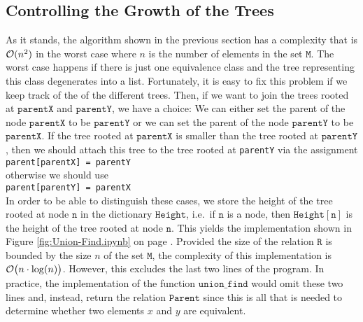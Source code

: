 \subsection{Controlling the Growth of the Trees}
As it stands, the algorithm shown in the previous section has a complexity that is $\mathcal{O}(n^2)$ in the
worst case where $n$ is the number of elements in the set $ \texttt{M}$.  The worst case happens if there
is just one equivalence class and the tree representing this class degenerates into a list.
Fortunately, it is easy to fix this problem if we keep track of the  of the
different trees.  Then, if we want to join the trees rooted at $\texttt{parentX}$ and
$\texttt{parentY}$, we have a choice: We can either set the parent of the node $\texttt{parentX}$ to
be $\texttt{parentY}$ or we can set the parent of the node $\texttt{parentY}$ to be $\texttt{parentX}$.
If the tree rooted at $\texttt{parentX}$ is smaller than the tree rooted at $\texttt{parentY}$, then we should
attach this tree to the tree rooted at \texttt{parentY} via the assignment
\\[0.2cm]
\hspace*{1.3cm}
\texttt{parent[parentX] = parentY}
\\[0.2cm]
otherwise we should use
\\[0.2cm]
\hspace*{1.3cm}
\texttt{parent[parentY] = parentX}
\\[0.2cm]
In order to be able to distinguish these cases, we store the height of the tree rooted at node
$\texttt{n}$ in the dictionary $\texttt{Height}$, i.e.~if $\texttt{n}$ is a node, then $\texttt{Height}[\mathtt{n}]$ is
the height of the tree rooted at node $\texttt{n}$.  This yields the implementation shown in Figure
\ref{fig:Union-Find.ipynb} on page \pageref{fig:Union-Find.ipynb}.  Provided the size  of the relation
$\texttt{R}$ is bounded by the size $n$ of the set $ \texttt{M}$, the complexity of this
implementation is $\mathcal{O}\bigl(n \cdot \log(n)\bigr)$.  However, this excludes the last two lines of
the program.  In practice, the implementation of the function $\texttt{union\_find}$ would omit these
two lines and, instead, return the relation $\texttt{Parent}$ since this is all that is needed to
determine whether two elements $x$ and $y$ are equivalent. 


